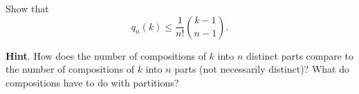 \documentclass{book}
\begin{document}
\setcounter{cpjt}{310}
\addtocounter{cpjt}{-1}
\begin{activity}\label{activity-303}
\hypertarget{p-1539}{}%
Show that%
\begin{equation*}
q_n(k) \le \frac{1}{n!}\binom{k-1}{n-1}.
\end{equation*}
%
\par\smallskip%
\noindent\textbf{Hint}.\hypertarget{hint-198}{}\quad%
\hypertarget{p-1540}{}%
How does the number of compositions of \(k\) into \(n\) distinct parts compare to the number of compositions of \(k\) into \(n\) parts (not necessarily distinct)? What do compositions have to do with partitions?%
\par\smallskip%
\noindent\end{activity}

\clearpage
\end{document}
